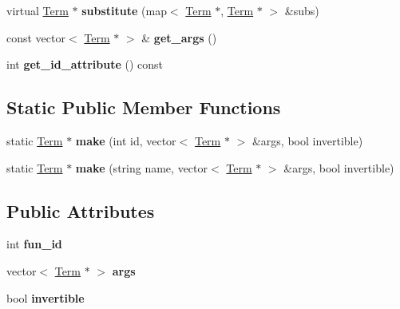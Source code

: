 \begin{DoxyCompactItemize}
\item 
\hypertarget{classFunctionTerm_a9fc573a0638b61a2546273facd56741c}{virtual \hyperlink{classTerm}{\-Term} $\ast$ {\bfseries substitute} (map$<$ \hyperlink{classTerm}{\-Term} $\ast$, \hyperlink{classTerm}{\-Term} $\ast$ $>$ \&subs)}\label{classFunctionTerm_a9fc573a0638b61a2546273facd56741c}

\item 
\hypertarget{classFunctionTerm_a9ff7b53d253720ca7a465241b614f2bd}{const vector$<$ \hyperlink{classTerm}{\-Term} $\ast$ $>$ \& {\bfseries get\-\_\-args} ()}\label{classFunctionTerm_a9ff7b53d253720ca7a465241b614f2bd}

\item 
\hypertarget{classFunctionTerm_ac976c859fad01ce48128390f6a6fecb1}{int {\bfseries get\-\_\-id\-\_\-attribute} () const }\label{classFunctionTerm_ac976c859fad01ce48128390f6a6fecb1}

\end{DoxyCompactItemize}
\subsection*{\-Static \-Public \-Member \-Functions}
\begin{DoxyCompactItemize}
\item 
\hypertarget{classFunctionTerm_a475997b6b7d2a2ca4e80da2fa07f1543}{static \hyperlink{classTerm}{\-Term} $\ast$ {\bfseries make} (int id, vector$<$ \hyperlink{classTerm}{\-Term} $\ast$ $>$ \&args, bool invertible)}\label{classFunctionTerm_a475997b6b7d2a2ca4e80da2fa07f1543}

\item 
\hypertarget{classFunctionTerm_ac5092f73a70c2bd5c888dca2997e19b8}{static \hyperlink{classTerm}{\-Term} $\ast$ {\bfseries make} (string name, vector$<$ \hyperlink{classTerm}{\-Term} $\ast$ $>$ \&args, bool invertible)}\label{classFunctionTerm_ac5092f73a70c2bd5c888dca2997e19b8}

\end{DoxyCompactItemize}
\subsection*{\-Public \-Attributes}
\begin{DoxyCompactItemize}
\item 
\hypertarget{classFunctionTerm_a311b58312868fff403a0d1128f57d204}{int {\bfseries fun\-\_\-id}}\label{classFunctionTerm_a311b58312868fff403a0d1128f57d204}

\item 
\hypertarget{classFunctionTerm_a7794d59a801102a8447313d18be77afd}{vector$<$ \hyperlink{classTerm}{\-Term} $\ast$ $>$ {\bfseries args}}\label{classFunctionTerm_a7794d59a801102a8447313d18be77afd}

\item 
\hypertarget{classFunctionTerm_a4996a70d946b3d6af3ac586d6fcd3793}{bool {\bfseries invertible}}\label{classFunctionTerm_a4996a70d946b3d6af3ac586d6fcd3793}

\end{DoxyCompactItemize}
